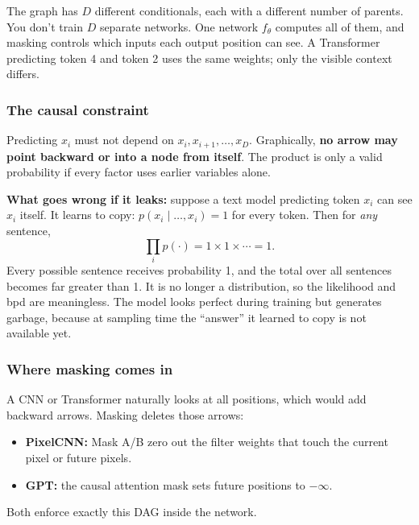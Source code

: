 The graph has $D$ different conditionals, each with a different number of parents. You don't train $D$ separate networks. One network $f_\theta$ computes all of them, and masking controls which inputs each output position can see. A Transformer predicting token 4 and token 2 uses the same weights; only the visible context differs.

\subsubsection*{The causal constraint}

Predicting $x_i$ must not depend on $x_i, x_{i+1}, \dots, x_D$. Graphically, \textbf{no arrow may point backward or into a node from itself}. The product is only a valid probability if every factor uses earlier variables alone.

\textbf{What goes wrong if it leaks:} suppose a text model predicting token $x_i$ can see $x_i$ itself. It learns to copy: $p(x_i \mid \ldots, x_i) = 1$ for every token. Then for \emph{any} sentence,
\[
\prod_i p(\cdot) = 1 \times 1 \times \cdots = 1.
\]
Every possible sentence receives probability 1, and the total over all sentences becomes far greater than 1. It is no longer a distribution, so the likelihood and bpd are meaningless. The model looks perfect during training but generates garbage, because at sampling time the ``answer'' it learned to copy is not available yet.

\subsubsection*{Where masking comes in}

A CNN or Transformer naturally looks at all positions, which would add backward arrows. Masking deletes those arrows:
\begin{itemize}
  \item \textbf{PixelCNN:} Mask A/B zero out the filter weights that touch the current pixel or future pixels.
  \item \textbf{GPT:} the causal attention mask sets future positions to $-\infty$.
\end{itemize}
Both enforce exactly this DAG inside the network.